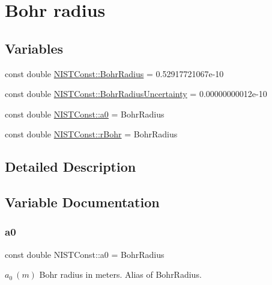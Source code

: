\hypertarget{group___bohr_radius}{}\section{Bohr radius}
\label{group___bohr_radius}
\subsection*{Variables}
\begin{DoxyCompactItemize}
\item 
const double \hyperlink{group___bohr_radius_ga38bdb86c2f3e484e8b164e75a3980638}{N\+I\+S\+T\+Const\+::\+Bohr\+Radius} = 0.\+52917721067e-\/10
\item 
const double \hyperlink{group___bohr_radius_gad031da8c7a2e239441e06c10fd8f6f07}{N\+I\+S\+T\+Const\+::\+Bohr\+Radius\+Uncertainty} = 0.\+00000000012e-\/10
\item 
const double \hyperlink{group___bohr_radius_gaa79b6b930d252d0cda2711c7993e918a}{N\+I\+S\+T\+Const\+::a0} = Bohr\+Radius
\item 
const double \hyperlink{group___bohr_radius_gad2a74a106c13086263e42411835b6352}{N\+I\+S\+T\+Const\+::r\+Bohr} = Bohr\+Radius
\end{DoxyCompactItemize}


\subsection{Detailed Description}


\subsection{Variable Documentation}
\mbox{\label{group___bohr_radius_gaa79b6b930d252d0cda2711c7993e918a}} 
\subsubsection{\texorpdfstring{a0}{a0}}
{\footnotesize\ttfamily const double N\+I\+S\+T\+Const\+::a0 = Bohr\+Radius}

$a_0 \ (m)$ Bohr radius in meters. Alias of Bohr\+Radius. \mbox{\label{group___bohr_radius_ga38bdb86c2f3e484e8b164e75a3980638}} 
